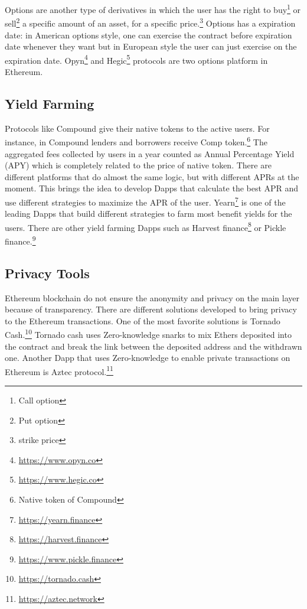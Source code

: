 Options are another type of derivatives in which the user has the right to buy\footnote{Call option} or sell\footnote{Put option} a specific amount of an asset, for a specific price.\footnote{strike price} Options has a expiration date: in American options style, one can exercise the contract before expiration date whenever they want but in European style the user can just exercise on the expiration date. Opyn\footnote{\url{https://www.opyn.co}} and Hegic\footnote{\url{https://www.hegic.co}} protocols are two options platform in Ethereum.


\subsection{Yield Farming}
Protocols like Compound give their native tokens to the active users. For instance, in Compound lenders and borrowers receive Comp token.\footnote{Native token of Compound} The aggregated fees collected by users in a year counted as Annual Percentage Yield (APY) which is completely related to the price of native token. There are different platforms that do almost the same logic, but with different APRs at the moment. This brings the idea to develop Dapps that calculate the best APR and use different strategies to maximize the APR of the user. Yearn\footnote{\url{https://yearn.finance}} is one of the leading Dapps that build different strategies to farm most benefit yields for the users. There are other yield farming Dapps such as Harvest finance\footnote{\url{https://harvest.finance}} or Pickle finance.\footnote{\url{https://www.pickle.finance}}

\subsection{Privacy Tools}
Ethereum blockchain do not ensure the anonymity and privacy on the main layer because of transparency. There are different solutions developed to bring privacy to the Ethereum transactions. One of the most favorite solutions is Tornado Cash.\footnote{\url{https://tornado.cash}} Tornado cash uses Zero-knowledge snarks to mix Ethers deposited into the contract and break the link between the deposited address and the withdrawn one. Another Dapp that uses Zero-knowledge to enable private transactions on Ethereum is Aztec protocol.\footnote{\url{https://aztec.network}}




